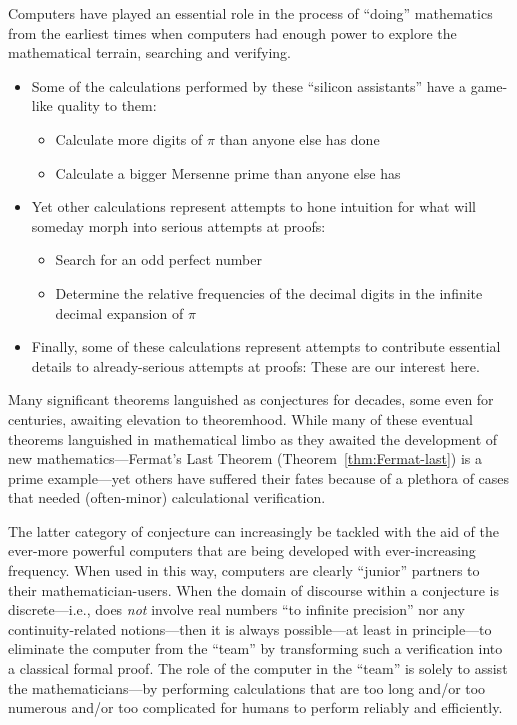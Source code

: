 Computers have played an essential role in the process of ``doing'' mathematics from the earliest times when computers had enough power to explore the mathematical terrain, searching and verifying.
\begin{itemize}
\item
Some of the calculations performed by these ``silicon assistants'' have a game-like quality to them:
  \begin{itemize}
  \item
Calculate more digits of $\pi$ than anyone else has done
  \medskip\item
Calculate a bigger Mersenne prime than anyone else has
  \end{itemize}

\medskip\item
Yet other calculations represent attempts to hone intuition for what will someday morph into serious attempts at proofs:
  \begin{itemize}
  \item
Search for an odd perfect number
  \medskip\item
Determine the relative frequencies of the decimal digits in the infinite decimal expansion of $\pi$
  \end{itemize}

\medskip\item
Finally, some of these calculations represent attempts to contribute essential details to already-serious attempts at proofs: These are our interest here.
\end{itemize}

Many significant theorems languished as conjectures for decades, some even for centuries, awaiting elevation to theoremhood.  While many of these eventual theorems languished in mathematical limbo as they awaited the development of new mathematics---Fermat's Last Theorem (Theorem~\ref{thm:Fermat-last}) is a prime example---yet others have suffered their fates because of a plethora of cases that needed (often-minor) calculational verification.

The latter category of conjecture can increasingly be tackled with the aid of the ever-more powerful computers that are being developed with ever-increasing frequency.  When used in this way, computers are clearly ``junior'' partners to their mathematician-users.  When the domain of discourse within a conjecture is discrete---i.e., does {\em not} involve real numbers ``to infinite precision'' nor any continuity-related notions---then it is always possible---at least in principle---to eliminate the computer from the ``team'' by transforming such a verification into a classical formal proof.  The role of the computer in the ``team'' is solely to assist the mathematicians---by
performing calculations that are too long and/or too numerous and/or too complicated for humans to perform reliably and efficiently.

